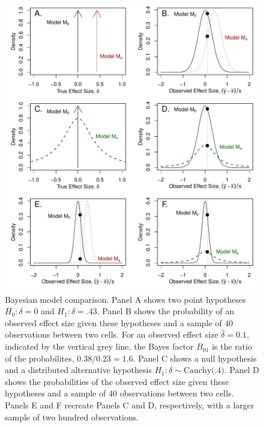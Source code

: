 \documentclass[man]{apa6}
\begin{document}

\begin{figure}
\includegraphics[width=\textwidth, keepaspectratio]{BFfigure.pdf}
\caption{Bayesian model comparison. Panel A shows two point hypotheses $H_0: \delta = 0$ and $H_1: \delta=.43$. Panel B shows the probability of an observed effect size given these hypotheses and a sample of 40 observations between two cells. For an observed effect size $\hat{\delta} = 0.1$, indicated by the vertical grey line, the Bayes factor $B_{01}$ is the ratio of the probabilites, $0.38 / 0.23 = 1.6$. Panel C shows a null hypothesis and a distributed alternative hypothesis $H_1: \delta \sim \mbox{Cauchy(.4)}$. Panel D shows the probabilities of the observed effect size given these hypotheses and a sample of 40 observations between two cells. Panels E and F recreate Panels C and D, respectively, with a larger sample of two hundred observations.}
\label{BFfig}
\end{figure}
\end{document}
